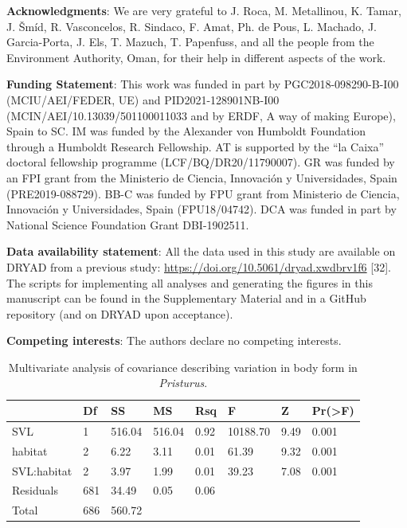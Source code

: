 \documentclass[
  11pt,
]{article}
\begin{document}
\textbf{Acknowledgments}: We are very grateful to J. Roca, M.
Metallinou, K. Tamar, J. Šmíd, R. Vasconcelos, R. Sindaco, F. Amat, Ph.
de Pous, L. Machado, J. Garcia-Porta, J. Els, T. Mazuch, T. Papenfuss,
and all the people from the Environment Authority, Oman, for their help
in different aspects of the work.

\textbf{Funding Statement}: This work was funded in part by
PGC2018-098290-B-I00 (MCIU/AEI/FEDER, UE) and PID2021-128901NB-I00
(MCIN/AEI/10.13039/501100011033 and by ERDF, A way of making Europe),
Spain to SC. IM was funded by the Alexander von Humboldt Foundation
through a Humboldt Research Fellowship. AT is supported by the ``la
Caixa'' doctoral fellowship programme (LCF/BQ/DR20/11790007). GR was
funded by an FPI grant from the Ministerio de Ciencia, Innovación y
Universidades, Spain (PRE2019-088729). BB-C was funded by FPU grant from
Ministerio de Ciencia, Innovación y Universidades, Spain (FPU18/04742).
DCA was funded in part by National Science Foundation Grant DBI-1902511.

\textbf{Data availability statement}: All the data used in this study
are available on DRYAD from a previous study:
\url{https://doi.org/10.5061/dryad.xwdbrv1f6} {[}32{]}. The scripts for
implementing all analyses and generating the figures in this manuscript
can be found in the Supplementary Material and in a GitHub repository
(and on DRYAD upon acceptance).

\textbf{Competing interests}: The authors declare no competing
interests.

\newpage

\begin{table}[H]

\caption{\label{tab:unnamed-chunk-1}Multivariate analysis of covariance describing variation in body form in \textit{Pristurus}.}
\centering
\begin{tabular}[t]{llllllll}
\toprule
  & Df & SS & MS & Rsq & F & Z & Pr(>F)\\
\midrule
SVL & 1 & 516.04 & 516.04 & 0.92 & 10188.70 & 9.49 & 0.001\\
habitat & 2 & 6.22 & 3.11 & 0.01 & 61.39 & 9.32 & 0.001\\
SVL:habitat & 2 & 3.97 & 1.99 & 0.01 & 39.23 & 7.08 & 0.001\\
Residuals & 681 & 34.49 & 0.05 & 0.06 &  &  & \\
Total & 686 & 560.72 &  &  &  &  & \\
\bottomrule
\end{tabular}
\end{table}
\end{document}
